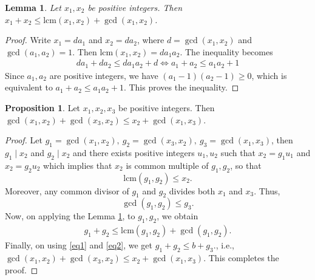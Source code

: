 \documentclass{amsart}
\newtheorem{lemma}[theorem]{Lemma}
\theoremstyle{definition}
\newtheorem{proposition}[theorem]{Proposition}
\theoremstyle{remark}
\numberwithin{equation}{section}
\begin{document}
    \begin{lemma}\label{gcd_lcm_inequality}
        Let $x_1, x_2$ be positive integers. Then $x_1 + x_2 \le \mathrm{lcm}(x_1,x_2) + \gcd(x_1,x_2)$.
    \end{lemma}
    \begin{proof}
        Write $x_1 = da_1$ and $x_2 = da_2$, where $d = \gcd(x_1, x_2)$ and $\gcd(a_1, a_2) = 1$. Then $\mathrm{lcm}(x_1, x_2) = da_1a_2$. The inequality becomes 
        \begin{align*}
            da_1 + da_2 \leq da_1a_2 + d \iff a_1 + a_2 \leq a_1a_2 + 1
        \end{align*}
        Since $a_1, a_2$ are positive integers, we have $(a_1 - 1)(a_2 -1) \geq 0$, which is equivalent to $a_1 + a_2 \leq a_1a_2 + 1$. This proves the inequality.
    \end{proof}
    \begin{proposition}\label{gcd_main_supporting_result}
        Let $x_1, x_2, x_3$ be positive integers. Then $\gcd (x_1, x_2) + \gcd (x_3, x_2) \leq x_2 + \gcd (x_1,x_3)$.
    \end{proposition}
    \begin{proof}
        Let $g_1 = \gcd(x_1,x_2),\ g_2 = \gcd(x_3,x_2),\ g_3 = \gcd(x_1,x_3)$, then $g_1 \mid x_2$ and $g_2 \mid x_2$ and there exists positive integers $u_1, u_2$ such that $x_2 = g_1u_1$ and $x_2 = g_2u_2$ which implies that $x_2$ is common multiple of $g_1, g_2$, so that
        \begin{equation}\label{eq1}
            \mathrm{lcm}(g_1,g_2) \leq x_2.
        \end{equation}
        Moreover, any common divisor of $g_1$ and $g_2$ divides both $x_1$ and $x_3$. Thus,
        \begin{equation}\label{eq2}
            \gcd(g_1,g_2) \le g_3.
        \end{equation}
        Now, on applying the Lemma \ref{gcd_lcm_inequality}, to $g_1, g_2$, we obtain
        \begin{align*}
            g_1 + g_2 \le \mathrm{lcm}(g_1,g_2) + \gcd(g_1,g_2).
        \end{align*}
        Finally, on using \eqref{eq1} and \eqref{eq2}, we get $g_1 + g_2 \le b + g_3.$, i.e., $\gcd (x_1, x_2) + \gcd (x_3, x_2) \leq x_2 + \gcd (x_1,x_3)$. This completes the proof.
    \end{proof}
\end{document}
